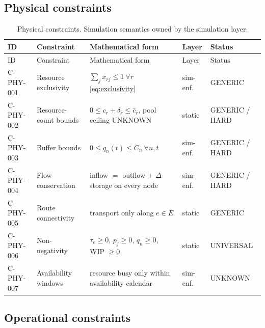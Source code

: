 \documentclass[11pt,a4paper]{article}
\begin{document}
\subsection*{Physical constraints}

\begin{center}
\small
\begin{longtable}{@{}lp{4.0cm}p{3.4cm}p{1.8cm}p{2.3cm}@{}}
\caption{Physical constraints. Simulation semantics owned by the simulation
layer.} \label{tab:physical}\\
\toprule
ID & Constraint & Mathematical form & Layer & Status \\
\midrule
\endfirsthead
\toprule
ID & Constraint & Mathematical form & Layer & Status \\
\midrule
\endhead
C-PHY-001 & Resource exclusivity & $\sum_j x_{rj} \le 1\ \forall r$
\eqref{eq:exclusivity} & sim-enf. & GENERIC \\
C-PHY-002 & Resource-count bounds & $0 \le c_r + \delta_r \le \bar{c}_r$,
pool ceiling UNKNOWN & static & GENERIC / HARD \\
C-PHY-003 & Buffer bounds & $0 \le q_n(t) \le C_n\ \forall n,t$ &
sim-enf. & GENERIC / HARD \\
C-PHY-004 & Flow conservation & inflow $=$ outflow $+$ $\Delta$ storage on
every node & sim-enf. & GENERIC / HARD \\
C-PHY-005 & Route connectivity & transport only along $e \in E$ & static &
GENERIC \\
C-PHY-006 & Non-negativity & $\tau_e \ge 0$, $p_j \ge 0$, $q_n \ge 0$,
WIP $\ge 0$ & static & UNIVERSAL \\
C-PHY-007 & Availability windows & resource busy only within availability
calendar & sim-enf. & UNKNOWN \\
\bottomrule
\end{longtable}
\end{center}

\subsection*{Operational constraints}
\end{document}
